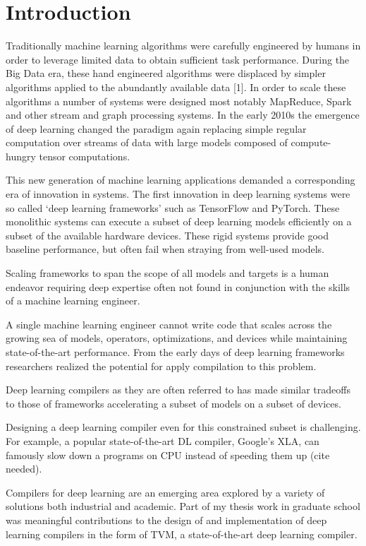 \chapter{Introduction}
\label{ch:intro}

Traditionally machine learning algorithms were carefully engineered by humans
in order to leverage limited data to obtain sufficient task performance.
During the Big Data era, these hand engineered algorithms were displaced by
simpler algorithms applied to the abundantly available data [1].
In order to scale these algorithms a number of systems were
designed most notably MapReduce, Spark and other stream and graph processing systems.
In the early 2010s the emergence of deep learning changed the paradigm again
replacing simple regular computation over streams of data with large models
composed of compute-hungry tensor computations.

This new generation of machine learning applications demanded a corresponding era of
innovation in systems.
The first innovation in deep learning systems were so called
‘deep learning frameworks’ such as TensorFlow and PyTorch.
These monolithic systems can execute a subset of deep learning models
efficiently on a subset of the available hardware devices.
These rigid systems provide good baseline performance, but often fail
when straying from well-used models.

Scaling frameworks to span the scope of all models and targets is a human endeavor
requiring deep expertise often not found in conjunction with the skills of a
machine learning engineer.

A single machine learning engineer cannot write code that scales across the growing
sea of models, operators, optimizations, and devices while maintaining state-of-the-art
performance. From the early days of deep learning frameworks researchers realized the
potential for apply compilation to this problem.

Deep learning compilers as they are often referred to has made similar tradeoffs to
those of frameworks accelerating a subset of models on a subset of devices.

Designing a deep learning compiler even for this constrained subset is challenging.
For example, a popular state-of-the-art DL compiler, Google's XLA, can famously
slow down a programs on CPU instead of speeding them up (cite needed).

Compilers for deep learning are an emerging area explored by a variety of solutions both
industrial and academic.
Part of my thesis work in graduate school was meaningful contributions to
the design of and implementation of deep learning compilers in the form of TVM,
a state-of-the-art deep learning compiler.

